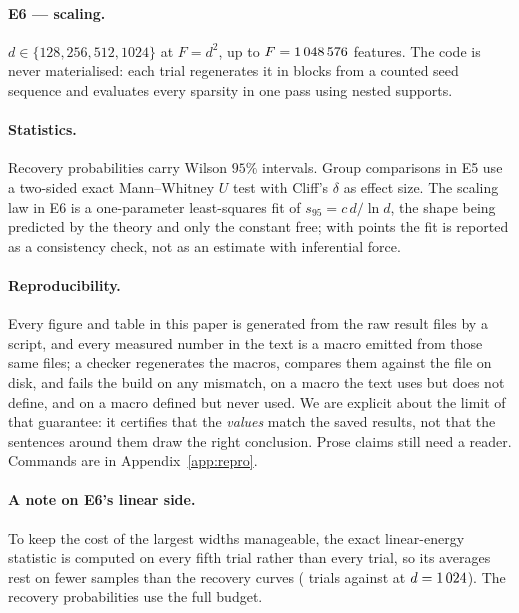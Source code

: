 \documentclass[preprint,12pt]{elsarticle}
\theoremstyle{definition}
\begin{document}
\paragraph{E6 --- scaling.} $d\in\{128,256,512,1024\}$ at $F=d^2$, up to
$F=1\,048\,576$ features. The code is never materialised: each trial regenerates it in blocks
from a counted seed sequence and evaluates every sparsity in one pass using nested supports.

\paragraph{Statistics.} Recovery probabilities carry Wilson $95\%$ intervals. Group
comparisons in E5 use a two-sided exact Mann--Whitney $U$ test with Cliff's $\delta$ as effect
size. The scaling law in E6 is a one-parameter least-squares fit of $s_{95}=c\,d/\ln d$, the
shape being predicted by the theory and only the constant free; with \EsixFitPoints{} points
the fit is reported as a consistency check, not as an estimate with inferential force.

\paragraph{Reproducibility.} Every figure and table in this paper is generated from the raw
result files by a script, and every measured number in the text is a macro emitted from those
same files; a checker regenerates the macros, compares them against the file on disk, and fails
the build on any mismatch, on a macro the text uses but does not define, and on a macro defined
but never used. We are explicit about the limit of that guarantee: it certifies that the
\emph{values} match the saved results, not that the sentences around them draw the right
conclusion. Prose claims still need a reader. Commands are in Appendix~\ref{app:repro}.

\paragraph{A note on E6's linear side.} To keep the cost of the largest widths manageable, the
exact linear-energy statistic is computed on every fifth trial rather than every trial, so its
averages rest on fewer samples than the recovery curves (\EsixEnergyTrialsTop{} trials against
\EsixOneZeroTwoFourTrials{} at $d=1\,024$). The recovery probabilities use the full budget.

\end{document}
